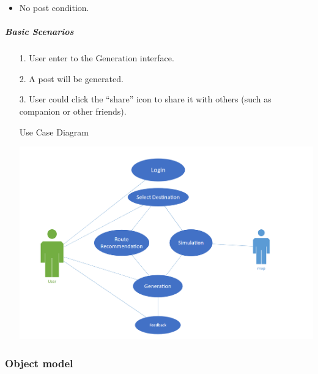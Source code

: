 \documentclass[10pt]{article}
\begin{document}
\begin{itemize}
\begin{itemize}
			 \item No post condition.
		 \end{itemize}

		 \subparagraph{Basic Scenarios}
		 \begin{itemize}
			 \item[1.] User enter to the Generation interface.
			 \item[2.]	A post will be generated.
			 \item[3.] User could click the “share” icon to share it with others (such as companion or other friends).
			 
			 \begin{center}
				 {\Large Use Case Diagram}

				 \includegraphics[width=14cm]{1.png} 
			 \end{center}
			 
			 
		 \end{itemize}
\end{itemize}

\subsubsection{Object model}
\end{document}
